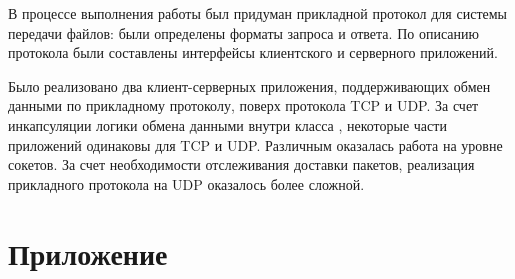 
В процессе выполнения работы был придуман прикладной протокол для системы передачи файлов: были определены форматы запроса и ответа. По описанию протокола были составлены интерфейсы клиентского и серверного приложений.

Было реализовано два клиент-серверных приложения, поддерживающих обмен данными по прикладному протоколу, поверх протокола TCP и UDP. За счет инкапсуляции логики обмена данными внутри класса , некоторые части приложений одинаковы для TCP и UDP. Различным оказалась работа на уровне сокетов. За счет необходимости отслеживания доставки пакетов, реализация прикладного протокола на UDP оказалось более сложной.

\newpage

\section*{Приложение}



